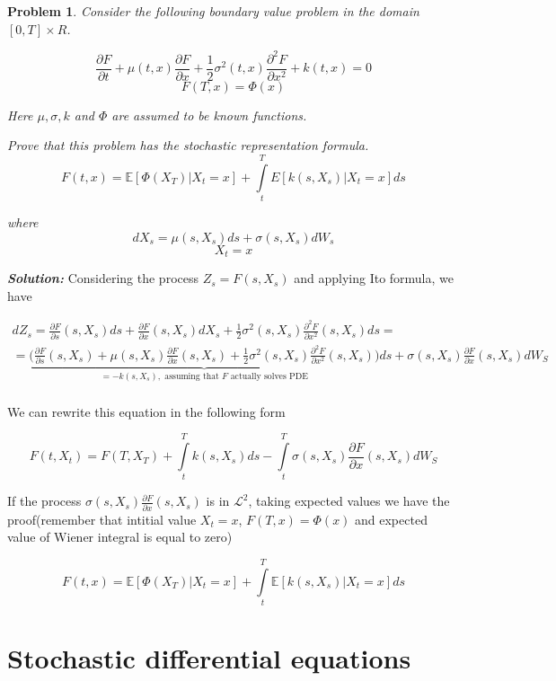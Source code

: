 \documentclass[a4paper, 12pt]{article}
\theoremstyle{problemstyle}
\newtheorem{problem}{Problem}[section]
\newenvironment{solution}
{\textit{\textbf{Solution:}}}
{}
\newcommand{\E}{\mathbb{E}}
\begin{document}
\begin{problem}
Consider the following boundary value problem in the domain
$[0,T] \times R$.

$$ 
\frac{\partial F}{\partial t} + \mu(t,x) \frac{\partial F}{\partial x} + \frac{1}{2}\sigma^2(t,x) \frac{\partial^2 F}{\partial x^2} + k(t,x) = 0
$$
$$
F(T,x) = \Phi(x)
$$

Here $\mu, \sigma, k$ and $\Phi$ are assumed to be known functions.

Prove that this problem has the stochastic representation formula.
$$
F(t, x) = \E[\Phi(X_T)| X_t = x] + \int\limits_t^T E[k(s, X_s)|X_t = x]ds
$$

where 
$$
dX_s = \mu(s, X_s) ds + \sigma(s, X_s) dW_s
$$
$$
X_t = x
$$
\end{problem}

\begin{solution}
Considering the process $Z_s = F(s, X_s)$ and applying Ito formula, we have

\begin{multline*}
dZ_s = \frac{\partial F }{\partial s} (s, X_s) ds + \frac{\partial F }{\partial x} (s, X_s) dX_s + \frac{1}{2} \sigma^2(s, X_s) \frac{\partial^2 F}{\partial x^2} (s, X_s)ds = \\ =\underbrace{\Big( \frac{\partial F }{\partial s} (s, X_s) + \mu(s, X_s) \frac{\partial F }{\partial x} (s, X_s)  + \frac{1}{2} \sigma^2(s, X_s) \frac{\partial^2 F}{\partial x^2} (s, X_s)\Big)}_{= -k(s, X_s), \text{ assuming that $F$ actually solves PDE} }ds + \sigma(s, X_s)\frac{\partial F }{\partial x} (s, X_s) dW_S \\
\end{multline*}

We can rewrite this equation in the following form

$$
F(t, X_t) = F(T, X_T) + \int\limits_{t}^{T}k(s,X_s)ds - \int\limits_{t}^{T}\sigma(s, X_s)\frac{\partial F }{\partial x} (s, X_s) dW_S
$$

If the process $\sigma(s, X_s)\frac{\partial F }{\partial x} (s, X_s)$ is in $\mathcal{L}^2 $, taking expected values we have the proof(remember that intitial value $X_t = x$, $F(T,x) = \Phi(x)$ and expected value of Wiener integral is equal to zero)

$$
F(t,x) = \E[\Phi(X_T)|X_t = x] + \int\limits_{t}^{T} \E[k(s,X_s)|X_t = x]ds
$$
\end{solution}




\section{Stochastic differential equations}
\end{document}
